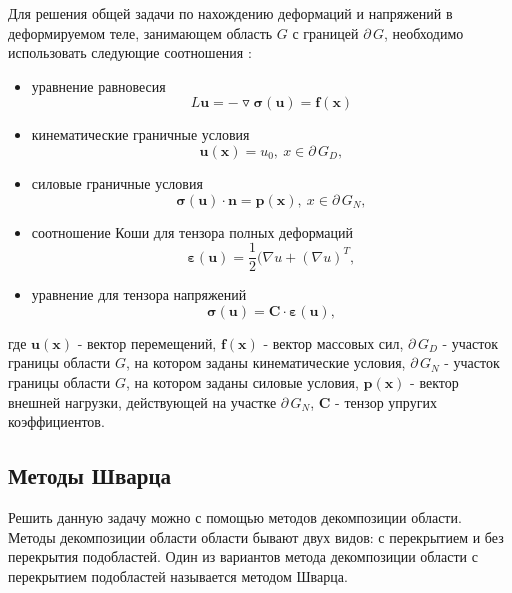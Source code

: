 \documentclass[a4paper, 14pt]{extarticle}
\begin{document}
Для решения общей задачи по нахождению деформаций и напряжений в деформируемом теле, занимающем область $G$ с границей $\partial \, G$, необходимо использовать следующие соотношения \cite{3}:

\begin{itemize}

\item уравнение равновесия
\begin{equation}
L \mathbf{u} = - \triangledown \bm{\sigma(u)} = \mathbf{f(x)}
\end{equation}

\item кинематические граничные условия
\begin{equation}
\bm{u(x)} = u_0, \ x \in \partial \, G_D,
\end{equation}

\item силовые граничные условия
\begin{equation}
\bm{\sigma}\mathbf{(u) \cdot n} = \mathbf{p(x)}, \ x \in \partial \, G_N,
\end{equation}

\item соотношение Коши для тензора полных деформаций
\begin{equation}
\bm{\varepsilon(u)}=\dfrac{1}{2}(\nabla u + (\nabla u)^T,
\end{equation}

\item уравнение для тензора напряжений
\begin{equation}
\bm{\sigma(u)} = \mathbf{C \cdot} \bm{\varepsilon}\mathbf{(u)},
\end{equation}
\end{itemize}

где $\mathbf{u(x)}$ - вектор перемещений, $\mathbf{f(x)}$ - вектор массовых сил, $\partial \, G_D$ - участок границы области $G$, на котором заданы кинематические условия, $\partial \, G_N$ - участок границы области $G$, на котором заданы силовые условия, $\mathbf{p(x)}$ - вектор внешней нагрузки, действующей на участке $\partial \, G_N$, $\mathbf{C}$ - тензор упругих коэффициентов. 

\newpage

\subsection{Методы Шварца}

Решить данную задачу можно с помощью методов декомпозиции области. Методы декомпозиции области области бывают двух видов: с перекрытием и без перекрытия подобластей. Один из вариантов метода декомпозиции области с перекрытием подобластей называется методом Шварца.
\end{document}
